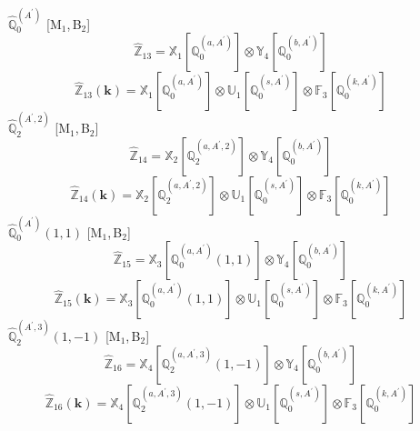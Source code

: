 \documentclass[fleqn,10pt,landscape]{article}
\begin{document}
\begin{itemize}
\begin{dmath*}
\end{dmath*}
\vspace{4mm}
\noindent {} $\,\,\,\hat{\mathbb{Q}}_{0}^{(A^{\prime})}$ [M$_{1}$,\,B$_{2}$]
\begin{dmath*}
\hat{\mathbb{Z}}_{13}=\mathbb{X}_{1}[\mathbb{Q}_{0}^{(a,A^{\prime})}] \otimes\mathbb{Y}_{4}[\mathbb{Q}_{0}^{(b,A^{\prime})}]
\end{dmath*}
\begin{dmath*}
\hat{\mathbb{Z}}_{13}(\bm{k})=\mathbb{X}_{1}[\mathbb{Q}_{0}^{(a,A^{\prime})}] \otimes\mathbb{U}_{1}[\mathbb{Q}_{0}^{(s,A^{\prime})}] \otimes\mathbb{F}_{3}[\mathbb{Q}_{0}^{(k,A^{\prime})}]
\end{dmath*}
\vspace{4mm}
\noindent {} $\,\,\,\hat{\mathbb{Q}}_{2}^{(A^{\prime},2)}$ [M$_{1}$,\,B$_{2}$]
\begin{dmath*}
\hat{\mathbb{Z}}_{14}=\mathbb{X}_{2}[\mathbb{Q}_{2}^{(a,A^{\prime},2)}] \otimes\mathbb{Y}_{4}[\mathbb{Q}_{0}^{(b,A^{\prime})}]
\end{dmath*}
\begin{dmath*}
\hat{\mathbb{Z}}_{14}(\bm{k})=\mathbb{X}_{2}[\mathbb{Q}_{2}^{(a,A^{\prime},2)}] \otimes\mathbb{U}_{1}[\mathbb{Q}_{0}^{(s,A^{\prime})}] \otimes\mathbb{F}_{3}[\mathbb{Q}_{0}^{(k,A^{\prime})}]
\end{dmath*}
\vspace{4mm}
\noindent {} $\,\,\,\hat{\mathbb{Q}}_{0}^{(A^{\prime})}(1,1)$ [M$_{1}$,\,B$_{2}$]
\begin{dmath*}
\hat{\mathbb{Z}}_{15}=\mathbb{X}_{3}[\mathbb{Q}_{0}^{(a,A^{\prime})}(1,1)] \otimes\mathbb{Y}_{4}[\mathbb{Q}_{0}^{(b,A^{\prime})}]
\end{dmath*}
\begin{dmath*}
\hat{\mathbb{Z}}_{15}(\bm{k})=\mathbb{X}_{3}[\mathbb{Q}_{0}^{(a,A^{\prime})}(1,1)] \otimes\mathbb{U}_{1}[\mathbb{Q}_{0}^{(s,A^{\prime})}] \otimes\mathbb{F}_{3}[\mathbb{Q}_{0}^{(k,A^{\prime})}]
\end{dmath*}
\vspace{4mm}
\noindent {} $\,\,\,\hat{\mathbb{Q}}_{2}^{(A^{\prime},3)}(1,-1)$ [M$_{1}$,\,B$_{2}$]
\begin{dmath*}
\hat{\mathbb{Z}}_{16}=\mathbb{X}_{4}[\mathbb{Q}_{2}^{(a,A^{\prime},3)}(1,-1)] \otimes\mathbb{Y}_{4}[\mathbb{Q}_{0}^{(b,A^{\prime})}]
\end{dmath*}
\begin{dmath*}
\hat{\mathbb{Z}}_{16}(\bm{k})=\mathbb{X}_{4}[\mathbb{Q}_{2}^{(a,A^{\prime},3)}(1,-1)] \otimes\mathbb{U}_{1}[\mathbb{Q}_{0}^{(s,A^{\prime})}] \otimes\mathbb{F}_{3}[\mathbb{Q}_{0}^{(k,A^{\prime})}]

\end{dmath*}
\end{itemize}
\end{document}
